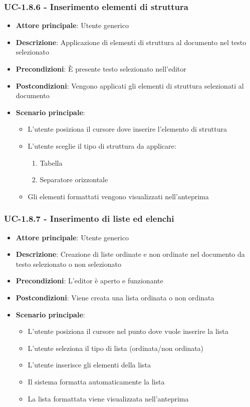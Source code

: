 \documentclass[11pt,a4paper]{article}
\begin{document}
\subsubsection{UC-1.8.6 - Inserimento elementi di struttura}
\begin{itemize}
    \item \textbf{Attore principale}: Utente generico
    \item \textbf{Descrizione}: Applicazione di elementi di struttura al documento nel testo selezionato
    \item \textbf{Precondizioni}: È presente testo selezionato nell’editor
    \item \textbf{Postcondizioni}: Vengono applicati gli elementi di struttura selezionati al documento
    \item \textbf{Scenario principale}:
        \begin{itemize}
            \item L’utente posiziona il cursore dove inserire l’elemento di struttura
            \item L’utente sceglie il tipo di struttura da applicare:
                \begin{enumerate}
                    \item Tabella
                    \item Separatore orizzontale
                \end{enumerate}
            \item Gli elementi formattati vengono visualizzati nell'anteprima
        \end{itemize}
\end{itemize}

\subsubsection{UC-1.8.7 - Inserimento di liste ed elenchi}
\begin{itemize}
    \item \textbf{Attore principale}: Utente generico
    \item \textbf{Descrizione}: Creazione di liste ordinate e non ordinate nel documento da testo selezionato o non selezionato
    \item \textbf{Precondizioni}: L'editor è aperto e funzionante
    \item \textbf{Postcondizioni}: Viene creata una lista ordinata o non ordinata
    \item \textbf{Scenario principale}:
        \begin{itemize}
            \item L'utente posiziona il cursore nel punto dove vuole inserire la lista
            \item L'utente seleziona il tipo di lista (ordinata/non ordinata)
            \item L'utente inserisce gli elementi della lista
            \item Il sistema formatta automaticamente la lista
            \item La lista formattata viene visualizzata nell'anteprima
        \end{itemize}
\end{itemize}
\end{document}
